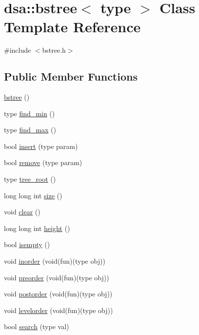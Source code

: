 \hypertarget{classdsa_1_1bstree}{}\section{dsa\+:\+:bstree$<$ type $>$ Class Template Reference}
\label{classdsa_1_1bstree}


{\ttfamily \#include $<$bstree.\+h$>$}

\subsection*{Public Member Functions}
\begin{DoxyCompactItemize}
\item 
\hyperlink{classdsa_1_1bstree_a83b87088098b0903b6eb97ea0be8ca30}{bstree} ()
\item 
type \hyperlink{classdsa_1_1bstree_a48e586702e417b8dae17351278e9a56f}{find\+\_\+min} ()
\item 
type \hyperlink{classdsa_1_1bstree_af6b00c7bf8dd6209fe4b0560ec9478e0}{find\+\_\+max} ()
\item 
bool \hyperlink{classdsa_1_1bstree_a6589bcbe87e0550aa31584bf80c88e47}{insert} (type param)
\item 
bool \hyperlink{classdsa_1_1bstree_ae54cc88e11be8fc79b117dfa0efab242}{remove} (type param)
\item 
type \hyperlink{classdsa_1_1bstree_acb010e3f4af4f31f5c7d6f3257015265}{tree\+\_\+root} ()
\item 
long long int \hyperlink{classdsa_1_1bstree_adf3527b853bd269858aca67e0ca71208}{size} ()
\item 
void \hyperlink{classdsa_1_1bstree_a3166a35ca4514a6b64250cb7f40e0d5b}{clear} ()
\item 
long long int \hyperlink{classdsa_1_1bstree_a1ed2231f4679dbf439a933c3002c6429}{height} ()
\item 
bool \hyperlink{classdsa_1_1bstree_a39022b29fce6529720c30e6e41bd4660}{isempty} ()
\item 
void \hyperlink{classdsa_1_1bstree_a1aac4beb85cd798212d72f9cd9a05e32}{inorder} (void(fun)(type obj))
\item 
void \hyperlink{classdsa_1_1bstree_aa27955e0a0bc9a3bd88e984a1125ff15}{preorder} (void(fun)(type obj))
\item 
void \hyperlink{classdsa_1_1bstree_a54aa2ec2a8d2e89b471e5d37bb4d6fad}{postorder} (void(fun)(type obj))
\item 
void \hyperlink{classdsa_1_1bstree_a2f78d4a07aa3500b80226ff6d11cb469}{levelorder} (void(fun)(type obj))
\item 
bool \hyperlink{classdsa_1_1bstree_a04583341f1c423cc043749f4b789f267}{search} (type val)
\end{DoxyCompactItemize}


